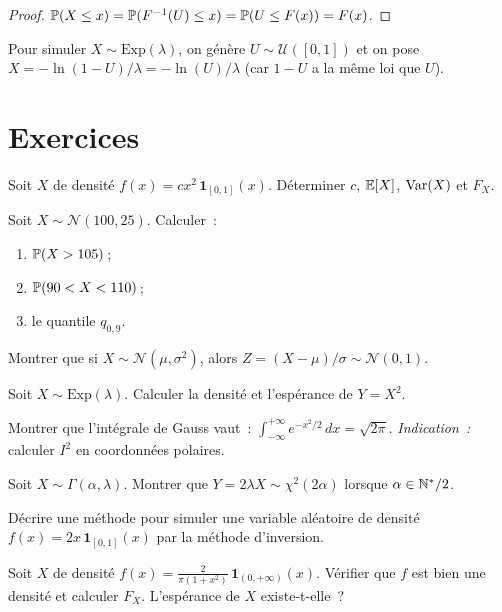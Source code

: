 \begin{proof}
$\mathbb{P}(X \leq x) = \mathbb{P}(F^{-1}(U) \leq x) = \mathbb{P}(U \leq F(x)) = F(x)$.
\end{proof}

\begin{exemple}
Pour simuler $X \sim \text{Exp}(\lambda)$, on g\'en\`ere $U \sim \mathcal{U}([0,1])$
et on pose $X = -\ln(1-U)/\lambda = -\ln(U)/\lambda$ (car $1-U$ a la m\^eme loi que $U$).
\end{exemple}

\section{Exercices}

\begin{exercice}
Soit $X$ de densit\'e $f(x) = cx^2\, \mathbf{1}_{[0,1]}(x)$. D\'eterminer $c$,
$\mathbb{E}[X]$, $\mathrm{Var}(X)$ et $F_X$.
\end{exercice}

\begin{exercice}
Soit $X \sim \mathcal{N}(100, 25)$. Calculer~:
\begin{enumerate}[label=(\alph*)]
    \item $\mathbb{P}(X > 105)$\,;
    \item $\mathbb{P}(90 < X < 110)$\,;
    \item le quantile $q_{0{,}9}$.
\end{enumerate}
\end{exercice}

\begin{exercice}
Montrer que si $X \sim \mathcal{N}(\mu, \sigma^2)$, alors $Z = (X - \mu)/\sigma
\sim \mathcal{N}(0,1)$.
\end{exercice}

\begin{exercice}
Soit $X \sim \text{Exp}(\lambda)$. Calculer la densit\'e et l'esp\'erance de
$Y = X^2$.
\end{exercice}

\begin{exercice}
Montrer que l'int\'egrale de Gauss vaut~:
$\int_{-\infty}^{+\infty} e^{-x^2/2}\, dx = \sqrt{2\pi}$.
\textit{Indication~:} calculer $I^2$ en coordonn\'ees polaires.
\end{exercice}

\begin{exercice}
Soit $X \sim \Gamma(\alpha, \lambda)$. Montrer que $Y = 2\lambda X \sim \chi^2(2\alpha)$
lorsque $\alpha \in \mathbb{N}^*/2$.
\end{exercice}

\begin{exercice}[Simulation]
D\'ecrire une m\'ethode pour simuler une variable al\'eatoire de densit\'e
$f(x) = 2x\, \mathbf{1}_{[0,1]}(x)$ par la m\'ethode d'inversion.
\end{exercice}

\begin{exercice}
Soit $X$ de densit\'e $f(x) = \frac{2}{\pi(1+x^2)}\, \mathbf{1}_{(0,+\infty)}(x)$.
V\'erifier que $f$ est bien une densit\'e et calculer $F_X$.
L'esp\'erance de $X$ existe-t-elle~?
\end{exercice}
